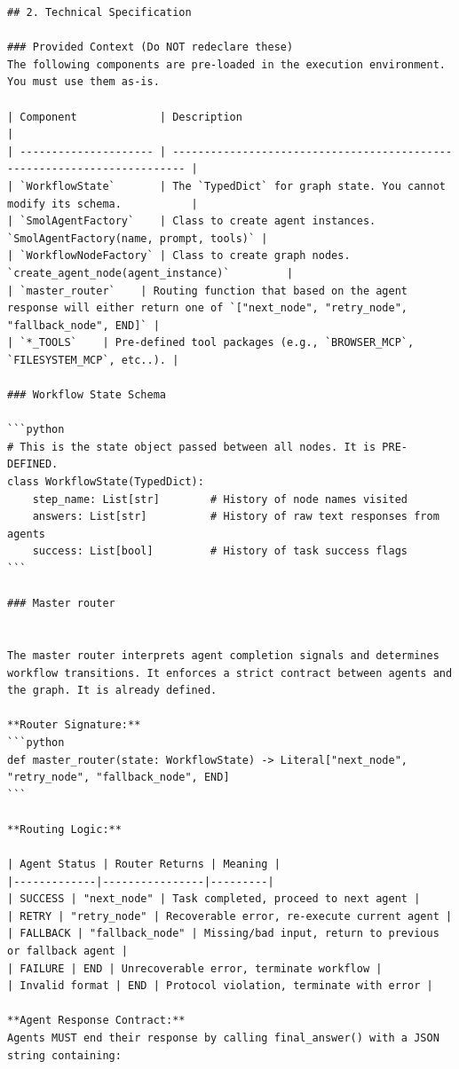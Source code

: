 \documentclass{article}
\begin{document}
\begin{verbatim}
## 2. Technical Specification

### Provided Context (Do NOT redeclare these)
The following components are pre-loaded in the execution environment. You must use them as-is.

| Component             | Description                                                              |
| --------------------- | ------------------------------------------------------------------------ |
| `WorkflowState`       | The `TypedDict` for graph state. You cannot modify its schema.           |
| `SmolAgentFactory`    | Class to create agent instances. `SmolAgentFactory(name, prompt, tools)` |
| `WorkflowNodeFactory` | Class to create graph nodes. `create_agent_node(agent_instance)`         |
| `master_router`    | Routing function that based on the agent response will either return one of `["next_node", "retry_node", "fallback_node", END]` |
| `*_TOOLS`    | Pre-defined tool packages (e.g., `BROWSER_MCP`, `FILESYSTEM_MCP`, etc..). |

### Workflow State Schema

```python
# This is the state object passed between all nodes. It is PRE-DEFINED.
class WorkflowState(TypedDict):
    step_name: List[str]        # History of node names visited
    answers: List[str]          # History of raw text responses from agents
    success: List[bool]         # History of task success flags
```

### Master router


The master router interprets agent completion signals and determines workflow transitions. It enforces a strict contract between agents and the graph. It is already defined.

**Router Signature:**
```python
def master_router(state: WorkflowState) -> Literal["next_node", "retry_node", "fallback_node", END]
```

**Routing Logic:**

| Agent Status | Router Returns | Meaning |
|-------------|----------------|---------|
| SUCCESS | "next_node" | Task completed, proceed to next agent |
| RETRY | "retry_node" | Recoverable error, re-execute current agent |
| FALLBACK | "fallback_node" | Missing/bad input, return to previous or fallback agent |
| FAILURE | END | Unrecoverable error, terminate workflow |
| Invalid format | END | Protocol violation, terminate with error |

**Agent Response Contract:**
Agents MUST end their response by calling final_answer() with a JSON string containing:


\end{verbatim}
\end{document}
